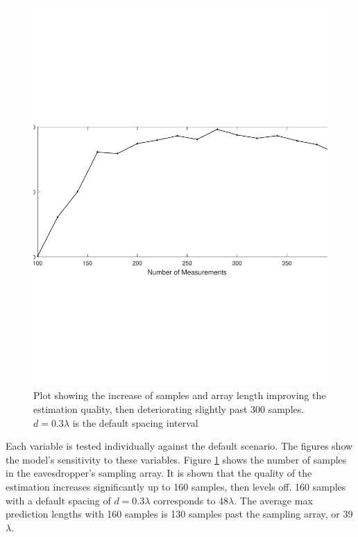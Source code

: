 \documentclass{allertonproc}
\begin{document}
\begin{figure}[tbp]
\begin{center}
\includegraphics[width=6in]{numMeasurements}
\caption{Plot showing the increase of samples and array length improving the estimation quality, then deteriorating slightly past 300 samples. $d = 0.3\lambda$ is the default spacing interval}\label{M}
\end{center}
\end{figure}
Each variable is tested individually against the default scenario. The figures show the model's sensitivity to these variables. Figure \ref{M} shows the number of samples in the eavesdropper's sampling array. It is shown that the quality of the estimation increases significantly up to 160 samples, then levels off. 160 samples with a default spacing of $d = 0.3\lambda$ corresponds to 48$\lambda$. The average max prediction lengths with 160 samples is 130 samples past the sampling array, or 39$\lambda$.
\end{document}
